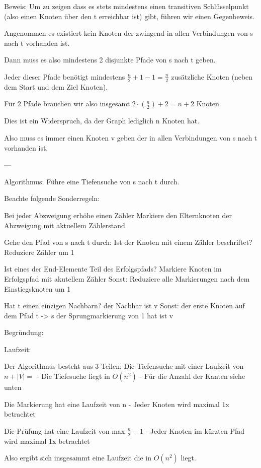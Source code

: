 Beweis:
Um zu zeigen dass es stets mindestens einen transitiven Schlüsselpunkt (also einen Knoten über den t erreichbar ist) gibt, führen wir einen  Gegenbeweis.

Angenommen es existiert kein Knoten der zwingend in allen Verbindungen von s nach t vorhanden ist.

Dann muss es also mindestens 2 disjunkte Pfade von s nach t geben.

Jeder dieser Pfade benötigt mindestens $ \frac{n}{2} +1 -1 = \frac{n}{2} $ zusätzliche Knoten (neben dem Start und dem Ziel Knoten).

Für 2 Pfade brauchen wir also insgesamt $ 2 \cdot (\frac{n}{2}) + 2 = n +2$ Knoten.

Dies ist ein Widerspruch, da der Graph lediglich n Knoten hat.

Also muss es immer einen Knoten v geben der in allen Verbindungen von s nach t vorhanden ist.

---

Algorithmus:
Führe eine Tiefensuche von s nach t durch.

	Beachte folgende Sonderregeln:

	Bei jeder Abzweigung erhöhe einen Zähler
	Markiere den Elternknoten der Abzweigung mit aktuellem Zählerstand


Gehe den Pfad von s nach t durch:
	Ist der Knoten mit einem Zähler beschriftet?
		Reduziere Zähler um 1
	
		Ist eines der End-Elemente Teil des Erfolgspfads?
			Markiere Knoten im Erfolgspfad mit akutellem Zähler
		Sonst:
			Reduziere alle Markierungen nach dem Einstiegsknoten um 1

Hat t einen einzigen Nachbarn?
	der Nacbhar ist v
Sonst:
	der erste Knoten auf dem Pfad t -> s der Sprungmarkierung von 1 hat ist v

Begründung:

Laufzeit:

Der Algorithmus besteht aus 3 Teilen:
	Die Tiefensuche mit einer Laufzeit von $ n + |V|= $ 
		- Die Tiefesuche liegt in $ O(n^{2})$ 
		- Für die Anzahl der Kanten siehe unten
	
	Die Markierung hat eine Laufzeit von n
		- Jeder Knoten wird maximal 1x betrachtet

	Die Prüfung hat eine Laufzeit von max $\frac{n}{2} - 1 $
		- Jeder Knoten im kürzten Pfad wird maximal 1x betrachtet

Also ergibt sich insgesammt eine Laufzeit die in $O(n^{2})$ liegt.

